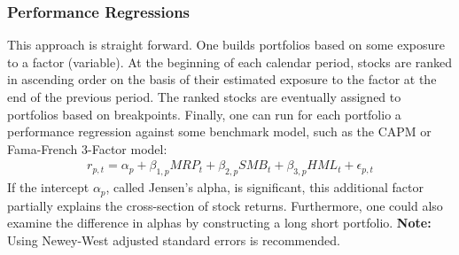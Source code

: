 \documentclass[xcolor=dvipsnames, english, 8pt]{beamer}
\begin{document}
\begin{frame}
    \frametitle{Performance Regressions}
This approach is straight forward. One builds portfolios based on some exposure to a factor (variable). At the beginning of each {\color{ubRed} calendar} period, stocks are ranked in ascending order on the basis of their estimated exposure to the factor at the end of the previous period. The ranked stocks are eventually assigned to portfolios based on breakpoints. Finally, one can run for each portfolio a performance regression against some benchmark model, such as the CAPM or Fama-French 3-Factor model:
\begin{align}
    r_{p,t} = \alpha_p + \beta_{1,p} MRP_t + \beta_{2,p} SMB_t + \beta_{3,p} HML_t + \epsilon_{p,t}
\end{align}
If the intercept $\alpha_p$, called {\color{ubRed}Jensen's alpha}, is significant, this additional factor partially explains the cross-section of stock returns. Furthermore, one could also examine the difference in alphas by constructing a long short portfolio.\vfill
\textbf{Note:} Using Newey-West adjusted standard errors is recommended.
\end{frame}
\end{document}
